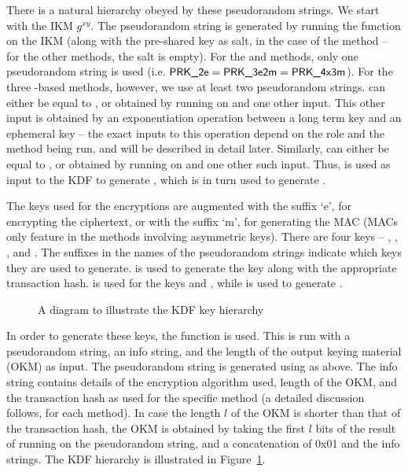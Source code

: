 There is a natural hierarchy obeyed by these pseudorandom strings. We start with the IKM $g^{xy}$. The pseudorandom string \mPRKtwo is generated by running the \mHkdfExtract function on the IKM (along with the pre-shared key as salt, in the case of the \mPskPsk method -- for the other methods, the salt is empty). For the \mPskPsk and \mSigSig methods, only one pseudorandom string is used (i.e. $\text{\textup{\textsf{PRK\_2e}}} = \text{\textup{\textsf{PRK\_3e2m}}} = \text{\textup{\textsf{PRK\_4x3m}}}$). For the three \mStat-based methods, however, we use at least two pseudorandom strings. \mPRKthree can either be equal to \mPRKtwo, or obtained by running \mHkdfExtract on \mPRKtwo and one other input. This other input is obtained by an exponentiation operation between a long term key and an ephemeral key -- the exact inputs to this operation depend on the role and the method being run, and will be described in detail later. Similarly, \mPRKfour can either be equal to \mPRKthree, or obtained by running \mHkdfExtract on \mPRKthree and one other such input. Thus, \mPRKtwo is used as input to the KDF to generate \mPRKthree, which is in turn used to generate \mPRKfour.

The keys used for the \mAead encryptions are augmented with the suffix `e', for encrypting the ciphertext, or with the suffix `m', for generating the MAC (MACs only feature in the methods involving asymmetric keys). There are four keys -- \mKtwom, \mKtwoe, \mKthreem, and \mKthreeae. The suffixes in the names of the pseudorandom strings indicate which keys they are used to generate. \mPRKtwo is used to generate the key \mKtwoe along with the appropriate transaction hash. \mPRKthree is used for the keys \mKtwom and \mKthreeae, while \mPRKfour is used to generate \mKthreem.

\begin{figure}[htp]
\centering

\caption{A diagram to illustrate the KDF key hierarchy}
\label{fig:kdfdiagram}
\end{figure}

In order to generate these keys, the \mHkdfExpand function is used. This is run with a pseudorandom string, an info string, and the length of the output keying material (OKM) as input. The pseudorandom string is generated using \mHkdfExtract as above. The info string contains details of the \mAead encryption algorithm used, length of the OKM, and the transaction hash as used for the specific method (a detailed discussion follows, for each method). In case the length $l$ of the OKM is shorter than that of the transaction hash, the OKM is obtained by taking the first $l$ bits of the result of running \mHmac on the pseudorandom string, and a concatenation of 0x01 and the info strings. The KDF hierarchy is illustrated in Figure~\ref{fig:kdfdiagram}.



